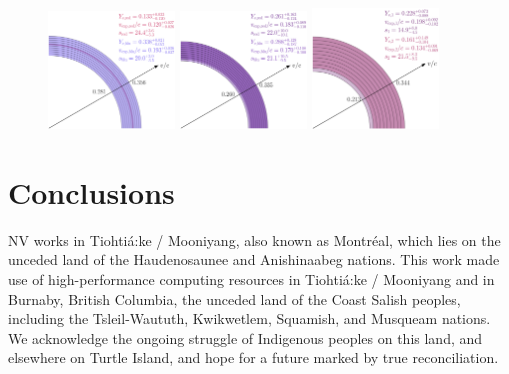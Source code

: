 \documentclass[twocolumn, twocolappendix]{aastex63}
\begin{document}
\begin{itemize}
\begin{figure}[!ht]
    \includegraphics[width=0.3\textwidth]{figs/multicomp_wedges_1.4d.png}
    \includegraphics[width=0.3\textwidth]{figs/multicomp_wedges_2.4d.png}
    \includegraphics[width=0.3\textwidth]{figs/multicomp_wedges_3.4d.png}
    \label{fig:infer_multicomp_wedges}
\end{figure}



\section{Conclusions}\label{sec:conclusions}



\acknowledgments


NV works in Tiohti{\'a}:ke / Mooniyang, also known as Montr{\'e}al, which lies on the unceded land of the Haudenosaunee and Anishinaabeg nations. This work made use of high-performance computing resources in Tiohti{\'a}:ke / Mooniyang and in Burnaby, British Columbia, the unceded land of the Coast Salish peoples, including the Tsleil-Waututh, Kwikwetlem, Squamish, and Musqueam nations. We acknowledge the ongoing struggle of Indigenous peoples on this land, and elsewhere on Turtle Island, and hope for a future marked by true reconciliation. 


\end{itemize}
\end{document}
